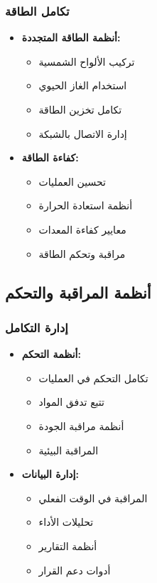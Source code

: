 \subsubsection{تكامل الطاقة}
\begin{itemize}
    \item \textbf{أنظمة الطاقة المتجددة:}
    \begin{itemize}
        \item تركيب الألواح الشمسية
        \item استخدام الغاز الحيوي
        \item تكامل تخزين الطاقة
        \item إدارة الاتصال بالشبكة
    \end{itemize}
    
    \item \textbf{كفاءة الطاقة:}
    \begin{itemize}
        \item تحسين العمليات
        \item أنظمة استعادة الحرارة
        \item معايير كفاءة المعدات
        \item مراقبة وتحكم الطاقة
    \end{itemize}
\end{itemize}

\subsection{أنظمة المراقبة والتحكم}

\subsubsection{إدارة التكامل}
\begin{itemize}
    \item \textbf{أنظمة التحكم:}
    \begin{itemize}
        \item تكامل التحكم في العمليات
        \item تتبع تدفق المواد
        \item أنظمة مراقبة الجودة
        \item المراقبة البيئية
    \end{itemize}
    
    \item \textbf{إدارة البيانات:}
    \begin{itemize}
        \item المراقبة في الوقت الفعلي
        \item تحليلات الأداء
        \item أنظمة التقارير
        \item أدوات دعم القرار
    \end{itemize}
\end{itemize}

